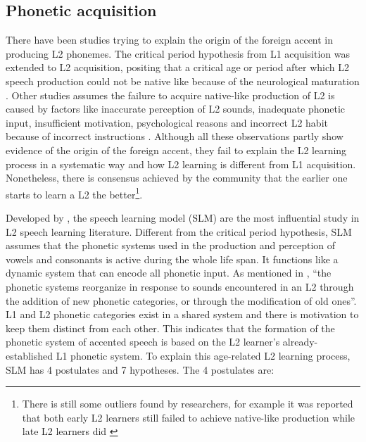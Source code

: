 \subsection{Phonetic acquisition}

There have been studies trying to explain the origin of the foreign accent in producing L2 phonemes. The critical period hypothesis from L1 acquisition was extended to L2 acquisition, positing that a critical age or period after which L2 speech production could not be native like because of the neurological maturation \citep{long1990maturational}. Other studies assumes the failure to acquire native-like production of L2 is caused by factors like inaccurate perception of L2 sounds, inadequate phonetic input, insufficient motivation, psychological reasons and incorrect L2 habit because of incorrect instructions \citep{flege1988production}. Although all these observations partly show evidence of the origin of the foreign accent, they fail to explain the L2 learning process in a systematic way and how L2 learning is different from L1 acquisition. Nonetheless, there is consensus achieved by the community that the earlier one starts to learn a L2 the better\footnote{There is still some outliers found by researchers, for example it was reported that both early L2 learners still failed to achieve native-like production while late L2 learners did \citep{flege1995second}}.

Developed by \cite{flege1995second}, the speech learning model (SLM) are the most influential study in L2 speech learning literature. Different from the critical period hypothesis, SLM assumes that the phonetic systems used in the production and perception of vowels and consonants is active during the whole life span. It functions like a dynamic system that can encode all phonetic input. As mentioned in \citep{flege1995second}, ``the phonetic systems reorganize in response to sounds encountered in an L2 through the addition of new phonetic categories, or through the modification of old ones''. L1 and L2 phonetic categories exist in a shared system and there is motivation to keep them distinct from each other. This indicates that the formation of the phonetic system of accented speech is based on the L2 learner's already-established L1 phonetic system. To explain this age-related L2 learning process, SLM has 4 postulates and 7 hypotheses. The 4 postulates \citep{flege1995second} are:

